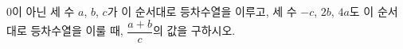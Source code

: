 $0$이 아닌 세 수 $a$, $b$, $c$가 이 순서대로 등차수열을 이루고, 세 수 $-c$, $2b$, $4a$도 이 순서대로 등차수열을 이룰 때, $\dfrac{a+b}{c}$의 값을 구하시오.
